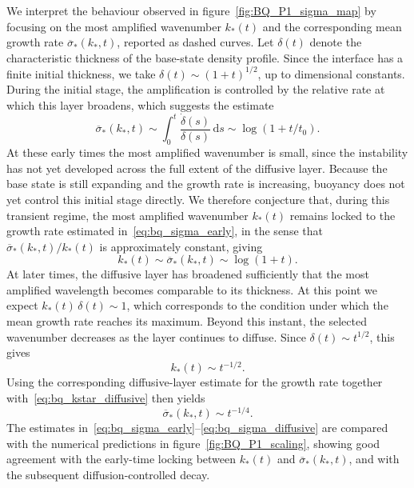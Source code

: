 We interpret the behaviour observed in figure~\ref{fig:BQ_P1_sigma_map} by focusing on the most
amplified wavenumber \(k_\ast(t)\) and the corresponding mean growth rate
\(\overline{\sigma}_\ast(k_\ast,t)\), reported as dashed curves. Let \(\delta(t)\) denote the
characteristic thickness of the base-state density profile. Since the interface has a finite
initial thickness, we take \(\delta(t) \sim (1+t)^{1/2}\), up to dimensional constants. During
the initial stage, the amplification is controlled by the relative rate at which this layer
broadens, which suggests the estimate
\begin{equation}
    \label{eq:bq_sigma_early}
    \overline{\sigma}_\ast(k_\ast,t)
    \sim
    \int_{0}^{t}
    \frac{\dot{\delta}(s)}{\delta(s)}\,\mathrm{d}s
    \sim
    \log\left(1+t/t_0\right).
\end{equation}
At these early times the most amplified wavenumber is small, since the instability has not yet
developed across the full extent of the diffusive layer. Because the base state is still expanding
and the growth rate is increasing, buoyancy does not yet control this initial stage directly. We
therefore conjecture that, during this transient regime, the most amplified wavenumber \(k_\ast(t)\)
remains locked to the growth rate estimated in~\eqref{eq:bq_sigma_early}, in the sense that
\(\overline{\sigma}_\ast(k_\ast,t)/k_\ast(t)\) is approximately constant, giving
\begin{equation}
    \label{eq:bq_kstar_early}
    k_\ast(t)
    \sim
    \overline{\sigma}_\ast(k_\ast,t)
    \sim
    \log\left(1+t\right).
\end{equation}
At later times, the diffusive layer has broadened sufficiently that the most amplified wavelength
becomes comparable to its thickness. At this point we expect \(k_\ast(t)\,\delta(t) \sim 1\),
which corresponds to the condition under which the mean growth rate reaches its maximum. Beyond
this instant, the selected wavenumber decreases as the layer continues to diffuse. Since
\(\delta(t) \sim t^{1/2}\), this gives
\begin{equation}
    \label{eq:bq_kstar_diffusive}
    k_\ast(t) \sim t^{-1/2}.
\end{equation}
Using the corresponding diffusive-layer estimate for the growth rate together
with~\eqref{eq:bq_kstar_diffusive} then yields
\begin{equation}
    \label{eq:bq_sigma_diffusive}
    \overline{\sigma}_\ast(k_\ast,t) \sim t^{-1/4}.
\end{equation}
The estimates in~\eqref{eq:bq_sigma_early}--\eqref{eq:bq_sigma_diffusive} are compared with the
numerical predictions in figure~\ref{fig:BQ_P1_scaling}, showing good agreement with the
early-time locking between \(k_\ast(t)\) and \(\overline{\sigma}_\ast(k_\ast,t)\), and with the
subsequent diffusion-controlled decay.

